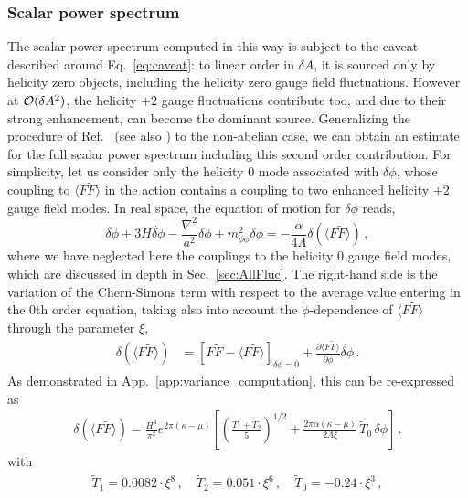 \subsubsection{Scalar power spectrum \label{subsec:PS}}

The scalar power spectrum computed in this way is subject to the caveat described around Eq.~\eqref{eq:caveat}:  to linear order in $\delta A$, it is sourced only by helicity zero objects, including the helicity zero gauge field fluctuations. However at ${\cal O}(\delta A^2)$, the helicity $+2$ gauge fluctuations contribute too, and due to their strong enhancement, can become the dominant source.
Generalizing the procedure of Ref.~\cite{Linde:2012bt} (see also \cite{Barnaby:2011qe}) to the non-abelian case, we can obtain an estimate for the full scalar power spectrum including this second order contribution. For simplicity, let us consider only the  helicity 0 mode associated with $\delta \phi$, whose coupling to $\langle F \tilde F \rangle$ in the action contains a coupling to two enhanced helicity $+2$ gauge field modes. In real space, the equation of motion for $\delta \phi$ reads,
\begin{equation}
 \ddot{\delta \phi} + 3 H \dot{\delta \phi} - \frac{\nabla^2}{a^2} \delta \phi + m_{\phi \phi}^2 \delta \phi = - \frac{\alpha}{4 \Lambda} \delta(\langle F \tilde F \rangle) \,,
 \label{eq:dphiRealSpace}
\end{equation}
where we have neglected here the couplings to the helicity 0 gauge field modes, which are discussed in depth in Sec.~\ref{sec:AllFluc}. The right-hand side is the variation of the Chern-Simons term with respect to the average value entering in the 0th order equation, taking also into account the $\dot \phi$-dependence of $\langle F \tilde F\rangle$ through the parameter $\xi$,
\begin{align}
 \delta (\langle F \tilde F \rangle ) & = [F \tilde F - \langle F \tilde F \rangle ]_{\delta \phi = 0} + \frac{\partial \langle F \tilde F \rangle }{\partial \dot \phi} \dot{\delta \phi} \,. 
\end{align}
As demonstrated in App.~\ref{app:variance_computation}, this can be re-expressed as 
\begin{align}
 \delta (\langle F \tilde F \rangle ) = \frac{H^4}{ \pi^2} e^{2 \pi(\kappa - \mu)} \left[  \left(\frac{ \tilde T_1 + \tilde T_2}{5} \right)^{1/2} + \frac{  2 \pi \alpha (\kappa - \mu ) }{2 \Lambda  \xi} \,  \tilde T_0  \, \delta \phi\right] \,.
\end{align}
with 
\begin{align}
\tilde T_1 = 0.0082 \cdot \xi^8   \,, \quad \tilde T_2 = 0.051 \cdot  \xi^6   \,, \quad \tilde T_0 = - 0.24 \cdot  \xi^3\,,
\end{align}
